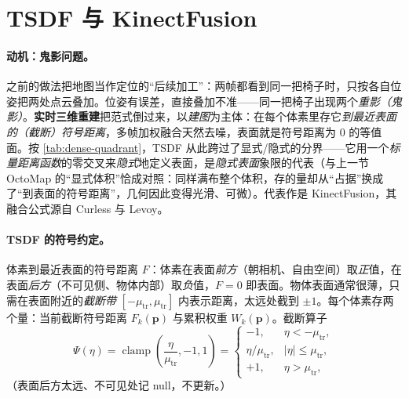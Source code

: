 \section{TSDF 与 KinectFusion}
\label{sec:dense-tsdf}

\paragraph{动机：鬼影问题。}
之前的做法把地图当作定位的“后续加工”：两帧都看到同一把椅子时，只按各自位姿把两处点云叠加。位姿有误差，直接叠加不准——同一把椅子出现两个\emph{重影（鬼影）}\cite{gaoxiang2019slam14}。\textbf{实时三维重建}把范式倒过来，以\emph{建图}为主体：在每个体素里存它\emph{到最近表面的（截断）符号距离}，多帧加权融合天然去噪，表面就是符号距离为 0 的等值面。按 \cref{tab:dense-quadrant}，TSDF 从此跨过了显式/隐式的分界——它用一个\emph{标量距离函数}的零交叉来\emph{隐式}地定义表面，是\emph{隐式表面}象限的代表（与上一节 OctoMap 的“显式体积”恰成对照：同样满布整个体积，存的量却从“占据”换成了“到表面的符号距离”，几何因此变得光滑、可微）。代表作是 KinectFusion\cite{newcombe2011kinectfusion}，其融合公式源自 Curless 与 Levoy\cite{curless1996volumetric}。

\paragraph{TSDF 的符号约定。}
体素到最近表面的符号距离 $F$：体素在表面\emph{前方}（朝相机、自由空间）取\emph{正}值，在表面\emph{后方}（不可见侧、物体内部）取\emph{负}值，$F=0$ 即表面。物体表面通常很薄，只需在表面附近的\emph{截断带} $[-\mu_{\mathrm{tr}},\mu_{\mathrm{tr}}]$ 内表示距离，太远处截到 $\pm 1$。每个体素存两个量：当前截断符号距离 $F_k(\mathbf{p})$ 与累积权重 $W_k(\mathbf{p})$。截断算子
\begin{equation}
  \Psi(\eta)=\operatorname{clamp}\!\left(\frac{\eta}{\mu_{\mathrm{tr}}},-1,1\right)=
  \begin{cases}-1,&\eta<-\mu_{\mathrm{tr}},\\ \eta/\mu_{\mathrm{tr}},&|\eta|\le\mu_{\mathrm{tr}},\\ +1,&\eta>\mu_{\mathrm{tr}},\end{cases}
  \label{eq:dense-tsdf-trunc}
\end{equation}
（表面后方太远、不可见处记 null，不更新。）

